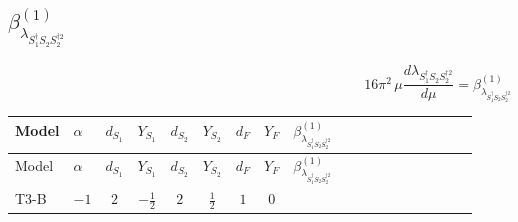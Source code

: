 \documentclass{article}
\begin{document}
\begin{landscape}
\section*{$\beta_{\lambda_{S_1^\dagger S_2 S_2^{\dagger 2}}}^{(1)}$}
\[16\pi^2\,\mu\frac{d \lambda_{S_1^\dagger S_2 S_2^{\dagger 2}}}{d\mu}=\beta_{\lambda_{S_1^\dagger S_2 S_2^{\dagger 2}}}^{(1)}\]
\tiny
\begin{longtable}{@{}llcccccc >{\raggedright\arraybackslash}p{0.54\linewidth}@{}}
\toprule
Model & $\alpha$ & $d_{S_1}$ & $Y_{S_1}$ & $d_{S_2}$ & $Y_{S_2}$ & $d_F$ & $Y_F$ & $\beta_{\lambda_{S_1^\dagger S_2 S_2^{\dagger 2}}}^{(1)}$ \\
\midrule
\endfirsthead
\toprule
Model & $\alpha$ & $d_{S_1}$ & $Y_{S_1}$ & $d_{S_2}$ & $Y_{S_2}$ & $d_F$ & $Y_F$ & $\beta_{\lambda_{S_1^\dagger S_2 S_2^{\dagger 2}}}^{(1)}$ \\
\midrule
\endhead
T3-B & $-1$ & $2$ & $-\frac{1}{2}$ & $2$ & $\frac{1}{2}$ & $1$ & $0$ & \scriptsize\adjustbox{max width=\linewidth}{$\begin{gathered} {\lambda_{12}} (\operatorname{Tr}\!\left({y_2}\,\left({y_1}\right)^{\dagger}\right)+6 {\lambda_{S_1^\dagger S_2 S_2^{\dagger 2}}}+6 {\lambda_{S_1 S_1^{\dagger 2}S_2^\dagger}}) \\ +{\lambda_{12}^{\rm Adj}} \left(\frac{1}{12} \operatorname{Tr}\!\left({y_2}\,\left({y_1}\right)^{\dagger}\right)+\frac{5 {\lambda_{S_1^\dagger S_2 S_2^{\dagger 2}}}}{6}+\frac{{\lambda_{S_1 S_1^{\dagger 2}S_2^\dagger}}}{6}\right) \\ +{\lambda_{S_1^{\dagger 2}S_2^{\dagger 2}}} (2 \operatorname{Tr}\!\left({y_1}\,\left({y_2}\right)^{\dagger}\right)+4 (5 \left({\lambda_{S_1^\dagger S_2 S_2^{\dagger 2}}}\right)^{*}+\left({\lambda_{S_1 S_1^{\dagger 2}S_2^\dagger}}\right)^{*})) \\ +{\lambda_{S_2}} (\operatorname{Tr}\!\left({y_2}\,\left({y_1}\right)^{\dagger}\right)+12 {\lambda_{S_1^\dagger S_2 S_2^{\dagger 2}}}) \\ +{\lambda_{S_1^\dagger S_2 S_2^{\dagger 2}}} (\operatorname{Tr}\!\left({y_1}\,\left({y_1}\right)^{\dagger}\right)+3 \operatorname{Tr}\!\left({y_2}\,\left({y_2}\right)^{\dagger}\right)) \\ -4 \operatorname{Tr}\!\left({y_2}\,\left({y_1}\right)^{\dagger}\,{y_2}\,\left({y_2}\right)^{\dagger}\right) \\ +4 \left({\lambda_{H^\dagger H^\dagger S_2 S_2}}\right)^{*} \left({\lambda_{T3}}\right)^{*} \\ -9 {g_2}^2 {\lambda_{S_1^\dagger S_2 S_2^{\dagger 2}}} \\ -3 {g_Y}^2 {\lambda_{S_1^\dagger S_2 S_2^{\dagger 2}}} \\ +2 {\lambda_{H2}} {\lambda_{H H^\dagger S_1^\dagger S_2^\dagger}^{\rm Cross}} \\ -\frac{{\lambda_{H2}^{\rm Adj}} {\lambda_{H H^\dagger S_1^\dagger S_2^\dagger}^{\rm Cross}}}{2}\end{gathered}$} \\

\end{longtable}
\end{landscape}
\end{document}
